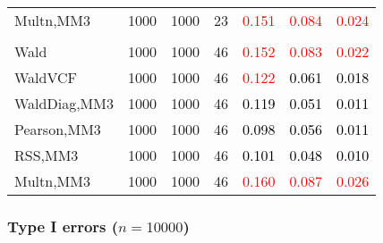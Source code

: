 \documentclass[
]{article}
\begin{document}
\begin{table}[H]
{\begin{tabular}[t]{lrrrrrr}
\hspace{1em}Multn,MM3 & 1000 & 1000 & 23 & \textcolor{red}{0.151} & \textcolor{red}{0.084} & \textcolor{red}{0.024}\\
\addlinespace[0.3em]
\multicolumn{7}{l}{\textbf{3F 15V}}\\
\hspace{1em}Wald & 1000 & 1000 & 46 & \textcolor{red}{0.152} & \textcolor{red}{0.083} & \textcolor{red}{0.022}\\
\hspace{1em}WaldVCF & 1000 & 1000 & 46 & \textcolor{red}{0.122} & \textcolor{black}{0.061} & \textcolor{black}{0.018}\\
\hspace{1em}WaldDiag,MM3 & 1000 & 1000 & 46 & \textcolor{black}{0.119} & \textcolor{black}{0.051} & \textcolor{black}{0.011}\\
\hspace{1em}Pearson,MM3 & 1000 & 1000 & 46 & \textcolor{black}{0.098} & \textcolor{black}{0.056} & \textcolor{black}{0.011}\\
\hspace{1em}RSS,MM3 & 1000 & 1000 & 46 & \textcolor{black}{0.101} & \textcolor{black}{0.048} & \textcolor{black}{0.010}\\
\hspace{1em}Multn,MM3 & 1000 & 1000 & 46 & \textcolor{red}{0.160} & \textcolor{red}{0.087} & \textcolor{red}{0.026}\\
\bottomrule
\end{tabular}}
\endgroup{}
\end{table}

\hypertarget{type-i-errors-n10000-2}{%
\subsubsection{\texorpdfstring{Type I errors
(\(n=10000\))}{Type I errors (n=10000)}}\label{type-i-errors-n10000-2}}
\end{document}
